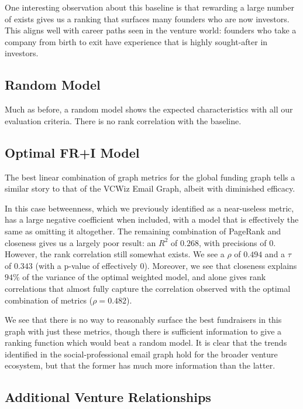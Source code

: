 One interesting observation about this baseline is that rewarding a large number of exists gives us a ranking that surfaces many founders who are now investors. This aligns well with career paths seen in the venture world: founders who take a company from birth to exit have experience that is highly sought-after in investors.

\subsection{Random Model}

Much as before, a random model shows the expected characteristics with all our evaluation criteria. There is no rank correlation with the baseline.

\subsection{Optimal FR+I Model}

The best linear combination of graph metrics for the global funding graph tells a similar story to that of the VCWiz Email Graph, albeit with diminished efficacy.

In this case betweenness, which we previously identified as a near-useless metric, has a large negative coefficient when included, with a model that is effectively the same as omitting it altogether. The remaining combination of PageRank and closeness gives us a largely poor result: an $R^2$ of $0.268$, with precisions of $0$. However, the rank correlation still somewhat exists. We see a $\rho$ of $0.494$ and a $\tau$ of $0.343$ (with a p-value of effectively $0$). Moreover, we see that closeness explains $94\%$ of the variance of the optimal weighted model, and alone gives rank correlations that almost fully capture the correlation observed with the optimal combination of metrics ($\rho = 0.482$).

We see that there is no way to reasonably surface the best fundraisers in this graph with just these metrics, though there is sufficient information to give a ranking function which would beat a random model. It is clear that the trends identified in the social-professional email graph hold for the broader venture ecosystem, but that the former has much more information than the latter.

\subsection{Additional Venture Relationships}

